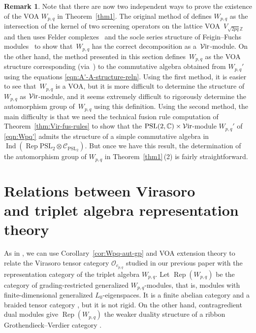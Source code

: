 \documentclass[pdftex]{sigma}
\numberwithin{equation}{section}
\theoremstyle{definition}
\newtheorem{Remark}[Theorem]{Remark}
\begin{document}
\begin{Remark}
Note that there are now two independent ways to prove the existence of the VOA $W_{p,q}$ in Theorem~\ref{thm1}. The original method of \cite{FGST1-Log} defines $W_{p,q}$ as the intersection of the kernel of two screening operators on the lattice VOA~$V_{\sqrt{2pq}\mathbb{Z}}$ and then uses Felder complexes~\cite{Felder} and the socle series structure of Feigin--Fuchs modules~\cite{Feigin--Fuchs} to show that~$W_{p,q}$ has the correct decomposition as a~$\mathcal{V}{\rm ir}$-module. On the other hand, the method presented in this section defines~$W_{p,q}$ as the VOA structure corresponding (via~\cite{HKL}) to the commutative algebra obtained from $W_{p,q}'$ using the equations \eqref{eqn:A'-A-structure-reln}.
Using the first method, it is easier to see that~$W_{p,q}$ is a VOA, but it is more difficult to determine the structure of~$W_{p,q}$ as $\mathcal{V}{\rm ir}$-module, and it seems extremely difficult to rigorously determine the automorphism group of~$W_{p,q}$ using this definition. Using the second method, the main difficulty is that we need the technical fusion rule computation of Theorem~\ref{thm:Vir-fus-rules} to show that the $\mathrm{PSL}(2,\mathbb{C})\times\mathcal{V}{\rm ir}$-module $W_{p,q}'$ of \eqref{eqn:Wpq'} admits the structure of a simple commutative algebra in $\operatorname{Ind}(\operatorname{Rep} \mathrm{PSL}_2\otimes\mathcal{C}_{\mathrm{PSL}_2})$. But once we have this result, the determination of the automorphism group of $W_{p,q}$ in Theorem~\ref{thm1}\,(2) is fairly straightforward.
\end{Remark}


\section[Relations between Virasoro and triplet algebra representation theory]{Relations between Virasoro\\ and triplet algebra representation theory}\label{sec:Vir-trip-relations}

As in \cite[Section 7]{MY-cp1-Vir}, we can use Corollary~\ref{cor:Wpq-aut-gp} and VOA extension theory \cite{CKM1, CMY1,HKL}
to relate the Virasoro tensor category $\mathcal{O}_{c_{p,q}}$ studied in our previous paper \cite{MS-cpq-Vir}
with the representation category of the triplet algebra $W_{p,q}$.
Let $\operatorname{Rep}(W_{p,q})$ be the category of grading-restricted generalized $W_{p,q}$-modules, that is, modules with finite-dimensional generalized $L_0$-eigenspaces.
It is a finite abelian category and a braided tensor category \cite{Hu-C2}, but it is not rigid. On the other hand, contragredient dual modules give $\operatorname{Rep}(W_{p,q})$ the weaker duality structure of a ribbon Grothendieck--Verdier category \cite{ALSW}.
\end{document}
